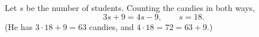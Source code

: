 Let $s$ be the number of students. Counting the candies in both ways,
\[3s+9=4s-9,\qquad s=\boxed{18}.\]
(He has $3\cdot18+9=63$ candies, and $4\cdot18=72=63+9$.)
